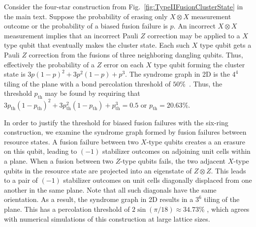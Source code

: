 \documentclass[reprint,
groupedaddress,
 prl,amsmath,amssymb,
 aps]{revtex4-2}
\theoremstyle{definition}
\begin{document}
\begin{bibunit}
Consider the four-star construction from Fig.~\ref{fig:TypeIIFusionClusterState} in the main text. Suppose the probability of erasing only $X\otimes X$ measurement outcome or the probability of a biased fusion failure is $p$. An incorrect $X\otimes X$ measurement implies that an incorrect Pauli $Z$ correction may be applied to a $X$ type qubit that eventually makes the cluster state. Each such $X$ type qubit gets a Pauli $Z$ correction from the fusions of three neighboring dangling qubits. Thus, effectively the probability of a $Z$ error on each $X$ type qubit forming the cluster state is $3p(1-p)^2+3p^2(1-p)+p^3$. The syndrome graph in 2D is the $4^4$ tiling of the plane with a bond percolation threshold of $50\%$~\cite{stace2009thresholds}. Thus, the threshold $p_\mathrm{th}$ may be found by requiring that $3p_\mathrm{th}(1-p_\mathrm{th})^2+3p_\mathrm{th}^2(1-p_\mathrm{th})+p_\mathrm{th}^3=0.5$ or $p_\mathrm{th} = 20.63\%$.


In order to justify the threshold for biased fusion failures with the six-ring construction, we examine the syndrome graph formed by fusion failures between resource states. A fusion failure between two $X$-type qubits creates a an erasure on this qubit, leading to $(-1)$ stabilizer outcomes on adjoining unit cells within a plane. When a fusion between two $Z$-type qubits fails, the two adjacent $X$-type qubits in the resource state are projected into an eigenstate of $Z \otimes Z$. This leads to a pair of $(-1)$ stabilizer outcomes on unit cells diagonally displaced from one another in the same plane. Note that all such diagonals have the same orientation. As a result, the syndrome graph in 2D results in a $3^6$ tiling of the plane. This has a percolation threshold of $2\sin(\pi/18)\approx 34.73\%$ \cite{sykes1964exact}, which agrees with numerical simulations of this construction at large lattice sizes.


\putbib[references]
\end{bibunit}
\end{document}
